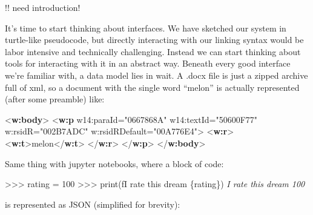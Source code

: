 \documentclass[10pt]{tufte-book}
\newenvironment{Shaded}{}{}
\newcommand{\BuiltInTok}[1]{#1}
\newcommand{\CommentTok}[1]{\textcolor[rgb]{0.38,0.63,0.69}{\textit{#1}}}
\newcommand{\DecValTok}[1]{\textcolor[rgb]{0.25,0.63,0.44}{#1}}
\newcommand{\KeywordTok}[1]{\textcolor[rgb]{0.00,0.44,0.13}{\textbf{#1}}}
\newcommand{\NormalTok}[1]{#1}
\newcommand{\OperatorTok}[1]{\textcolor[rgb]{0.40,0.40,0.40}{#1}}
\newcommand{\OtherTok}[1]{\textcolor[rgb]{0.00,0.44,0.13}{#1}}
\newcommand{\SpecialCharTok}[1]{\textcolor[rgb]{0.25,0.44,0.63}{#1}}
\newcommand{\SpecialStringTok}[1]{\textcolor[rgb]{0.73,0.40,0.53}{#1}}
\newcommand{\StringTok}[1]{\textcolor[rgb]{0.25,0.44,0.63}{#1}}
\begin{document}
 !! need introduction!

It's time to start thinking about interfaces. We have sketched our
system in turtle-like pseudocode, but directly interacting with our
linking syntax would be labor intensive and technically challenging.
Instead we can start thinking about tools for interacting with it in an
abstract way. Beneath every good interface we're familiar with, a data
model lies in wait. A .docx file is just a zipped archive full of xml,
so a document with the single word ``melon'' is actually represented
(after some preamble) like:

\begin{Shaded}
\begin{Highlighting}[]
\NormalTok{\textless{}}\KeywordTok{w:body}\NormalTok{\textgreater{}}
\NormalTok{  \textless{}}\KeywordTok{w:p} 
\OtherTok{    w14:paraId=}\StringTok{"0667868A"} 
\OtherTok{    w14:textId=}\StringTok{"50600F77"} 
\OtherTok{    w:rsidR=}\StringTok{"002B7ADC"} 
\OtherTok{    w:rsidRDefault=}\StringTok{"00A776E4"}\NormalTok{\textgreater{}}
\NormalTok{    \textless{}}\KeywordTok{w:r}\NormalTok{\textgreater{}}
\NormalTok{        \textless{}}\KeywordTok{w:t}\NormalTok{\textgreater{}melon\textless{}/}\KeywordTok{w:t}\NormalTok{\textgreater{}}
\NormalTok{    \textless{}/}\KeywordTok{w:r}\NormalTok{\textgreater{}}
\NormalTok{  \textless{}/}\KeywordTok{w:p}\NormalTok{\textgreater{}  }
\NormalTok{\textless{}/}\KeywordTok{w:body}\NormalTok{\textgreater{}}
\end{Highlighting}
\end{Shaded}

Same thing with jupyter notebooks, where a block of code:

\begin{Shaded}
\begin{Highlighting}[]
\OperatorTok{\textgreater{}\textgreater{}\textgreater{}}\NormalTok{ rating }\OperatorTok{=} \DecValTok{100}
\OperatorTok{\textgreater{}\textgreater{}\textgreater{}} \BuiltInTok{print}\NormalTok{(}\SpecialStringTok{f\textquotesingle{}I rate this dream }\SpecialCharTok{\{}\NormalTok{rating}\SpecialCharTok{\}}\SpecialStringTok{\textquotesingle{}}\NormalTok{)}
\CommentTok{\textquotesingle{}I rate this dream 100\textquotesingle{}}
\end{Highlighting}
\end{Shaded}

is represented as JSON (simplified for brevity):
\end{document}

